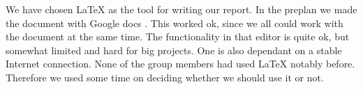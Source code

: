 We have chosen \LaTeX{} as the tool for writing our report. In the preplan we
made the document with Google docs \cite{GoogleDrive}. This worked ok, since
we all could work with the document at the same time. The functionality in that
editor is quite ok, but somewhat limited and hard for big projects. One is
also dependant on a stable Internet connection. None of the group members had
used \LaTeX{} notably before. Therefore we used some time on deciding whether we
should use it or not.